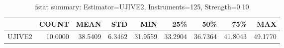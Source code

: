 \begin{table}[ht]
\centering
\caption{fstat summary: Estimator=UJIVE2, Instruments=125, Strength=0.10}
\begin{tabular}{lrrrrrrrr}
\toprule
 & COUNT & MEAN & STD & MIN & 25\% & 50\% & 75\% & MAX \\
\midrule
UJIVE2 & 10.0000 & 38.5409 & 6.3462 & 31.9559 & 33.2904 & 36.7364 & 41.8043 & 49.1770 \\
\bottomrule
\end{tabular}
\end{table}
